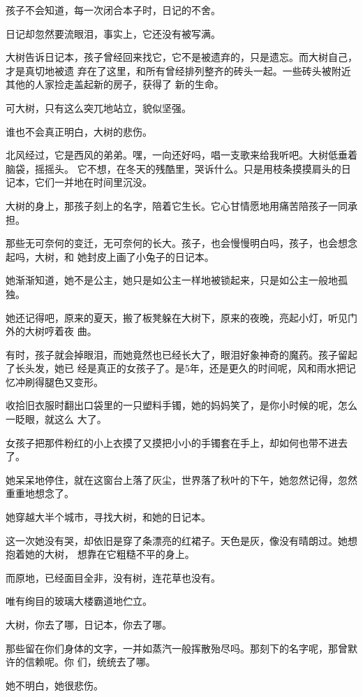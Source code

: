 \documentclass[12pt,a4paper]{article}
\begin{document}
		孩子不会知道，每一次闭合本子时，日记的不舍。

		日记却忽然要流眼泪，事实上，它还没有被写满。

		大树告诉日记本，孩子曾经回来找它，它不是被遗弃的，只是遗忘。而大树自己，才是真切地被遗
	弃在了这里，和所有曾经排列整齐的砖头一起。一些砖头被附近其他的人家捡走盖起新的房子，获得了
	新的生命。

		可大树，只有这么突兀地站立，貌似坚强。

		谁也不会真正明白，大树的悲伤。


		北风经过，它是西风的弟弟。嘿，一向还好吗，唱一支歌来给我听吧。大树低垂着脑袋，摇摇头。
	它不想，在冬天的残酷里，哭诉什么。只是用枝条摸摸肩头的日记本，它们一并地在时间里沉没。

		大树的身上，那孩子刻上的名字，陪着它生长。它心甘情愿地用痛苦陪孩子一同承担。

		那些无可奈何的变迁，无可奈何的长大。孩子，也会慢慢明白吗，孩子，也会想念起吗，大树，和
	她封皮上画了小兔子的日记本。


		她渐渐知道，她不是公主，她只是如公主一样地被锁起来，只是如公主一般地孤独。

		她还记得吧，原来的夏天，搬了板凳躲在大树下，原来的夜晚，亮起小灯，听见门外的大树哼着夜
	曲。

		有时，孩子就会掉眼泪，而她竟然也已经长大了，眼泪好象神奇的魔药。孩子留起了长头发，她已
	经是真正的女孩子了。是5年，还是更久的时间呢，风和雨水把记忆冲刷得腿色又变形。

		收拾旧衣服时翻出口袋里的一只塑料手镯，她的妈妈笑了，是你小时候的呢，怎么一眨眼，就这么
	大了。

		女孩子把那件粉红的小上衣摸了又摸把小小的手镯套在手上，却如何也带不进去了。

		她呆呆地停住，就在这窗台上落了灰尘，世界落了秋叶的下午，她忽然记得，忽然重重地想念了。

		她穿越大半个城市，寻找大树，和她的日记本。

		这一次她没有哭，却依旧是穿了条漂亮的红裙子。天色是灰，像没有晴朗过。她想抱着她的大树，
	想靠在它粗糙不平的身上。

		而原地，已经面目全非，没有树，连花草也没有。

		唯有绚目的玻璃大楼霸道地伫立。


		大树，你去了哪，日记本，你去了哪。

		那些留在你们身体的文字，一并如蒸汽一般挥散殆尽吗。那刻下的名字呢，那曾默许的信赖呢。你
	们，统统去了哪。


		她不明白，她很悲伤。
\end{document}
